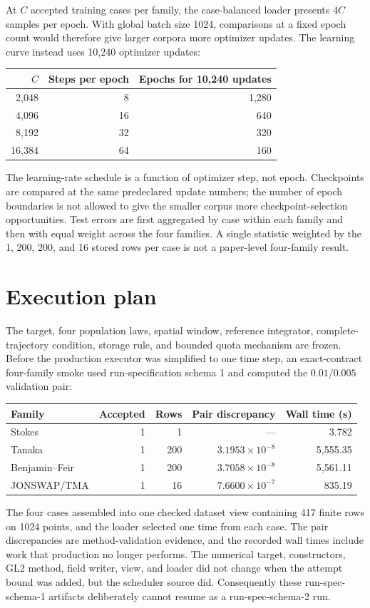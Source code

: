 \documentclass[11pt]{article}
\begin{document}
At $C$ accepted training cases per family, the case-balanced loader presents
$4C$ samples per epoch.  With global batch size 1024, comparisons at a fixed
epoch count would therefore give larger corpora more optimizer updates.  The
learning curve instead uses 10,240 optimizer updates:
\begin{center}
\begin{tabular}{@{}rrr@{}}
  \toprule
  $C$ & Steps per epoch & Epochs for 10,240 updates \\
  \midrule
  2,048  & 8   & 1,280 \\
  4,096  & 16  & 640 \\
  8,192  & 32  & 320 \\
  16,384 & 64  & 160 \\
  \bottomrule
\end{tabular}
\end{center}
The learning-rate schedule is a function of optimizer step, not epoch.
Checkpoints are compared at the same predeclared update numbers; the number
of epoch boundaries is not allowed to give the smaller corpus more
checkpoint-selection opportunities.  Test errors are first aggregated by
case within each family and then with equal weight across the four families.
A single statistic weighted by the 1, 200, 200, and 16 stored rows per case
is not a paper-level four-family result.

\section{Execution plan}
\label{sec:execution}

The target, four population laws, spatial window, reference integrator,
complete-trajectory condition, storage rule, and bounded quota mechanism are
frozen.  Before the production executor was simplified to one time step, an
exact-contract four-family smoke used run-specification schema 1 and computed
the $0.01/0.005$ validation pair:
\begin{center}
\small
\begin{tabular}{@{}lrrrr@{}}
  \toprule
  Family & Accepted & Rows & Pair discrepancy & Wall time (s) \\
  \midrule
  Stokes & 1 & 1   & ---                       & 3.782 \\
  Tanaka & 1 & 200 & $3.1953\times10^{-8}$     & 5,555.35 \\
  Benjamin--Feir & 1 & 200 & $3.7058\times10^{-8}$ & 5,561.11 \\
  JONSWAP/TMA & 1 & 16 & $7.6600\times10^{-7}$  & 835.19 \\
  \bottomrule
\end{tabular}
\end{center}
The four cases assembled into one checked dataset view containing 417 finite
rows on 1024 points, and the loader selected one time from each case.  The
pair discrepancies are method-validation evidence, and the recorded wall
times include work that production no longer performs.  The numerical target,
constructors, GL2 method, field writer, view, and loader did not change when
the attempt bound was added, but the scheduler source did.  Consequently
these run-spec-schema-1 artifacts deliberately cannot resume as a
run-spec-schema-2 run.
\end{document}
